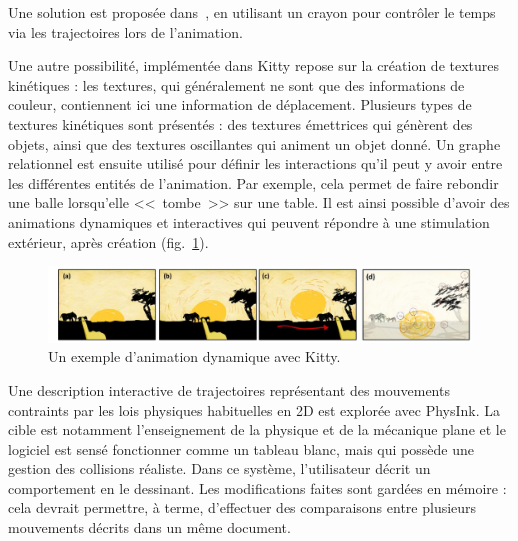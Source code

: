\documentclass[french,12pt]{article}
\begin{document}
Une solution est proposée dans~\cite{santosa_direct_2013}, en utilisant un crayon pour contrôler le temps via les trajectoires lors de l'animation.

Une autre possibilité, implémentée dans Kitty\cite{kazi_kitty:_2014} repose sur la création de textures kinétiques : les textures, qui généralement ne sont que des informations de couleur, contiennent ici une information de déplacement. Plusieurs types de textures kinétiques sont présentés : des textures émettrices qui génèrent des objets, ainsi que des textures oscillantes qui animent un objet donné. Un graphe relationnel est ensuite utilisé pour définir les interactions qu'il peut y avoir entre les différentes entités de l'animation. Par exemple, cela permet de faire rebondir une balle lorsqu'elle <<~tombe~>> sur une table. Il est ainsi possible d'avoir des animations dynamiques et interactives qui peuvent répondre à une stimulation extérieur, après création (fig.~\ref{fig.kitty}).

\begin{figure}[h]
    \centering
    \includegraphics[scale=0.45]{images/kitty.png}
    \caption{Un exemple d'animation dynamique avec Kitty.}
    \label{fig.kitty}
\end{figure}

Une description interactive de trajectoires représentant des mouvements contraints par les lois physiques habituelles en 2D est explorée avec PhysInk\cite{scott_physink:_2013}. La cible est notamment l'enseignement de la physique et de la mécanique plane et le logiciel est sensé fonctionner comme un tableau blanc, mais qui possède une gestion des collisions réaliste. Dans ce système, l'utilisateur décrit un comportement en le dessinant. Les modifications faites sont gardées en mémoire : cela devrait permettre, à terme, d'effectuer des comparaisons entre plusieurs mouvements décrits dans un même document.
\end{document}
